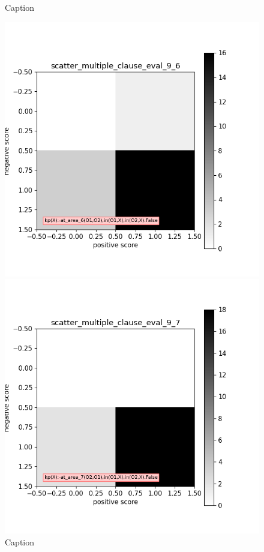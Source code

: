 \documentclass[
]{ceurart}
\begin{document}
\begin{figure}[h]
\begin{minipage}[b]{.3\textwidth}
		\caption{Caption}\label{label-f}
	\end{minipage}
	\begin{minipage}[b]{.3\textwidth}
		\includegraphics[width=\textwidth]{img/mce/mce-6.png}
		\caption{Caption}\label{label-g}
	\end{minipage}
	\begin{minipage}[b]{.3\textwidth}
		\includegraphics[width=\textwidth]{img/mce/mce-7.png}

\end{minipage}
\end{figure}
\end{document}
